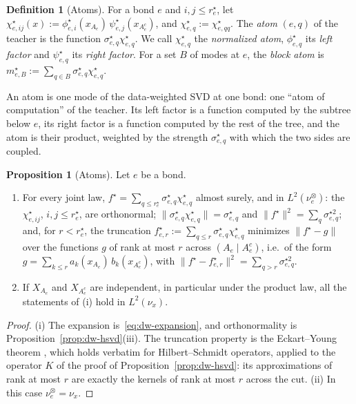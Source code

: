 \documentclass[11pt]{article}
\newcommand{\norm}[1]{\lVert #1\rVert}
\theoremstyle{definition}
\newtheorem{proposition}[theorem]{Proposition}
\newtheorem{definition}[theorem]{Definition}
\numberwithin{equation}{section}
\begin{document}
\begin{definition}[Atoms]\label{def:atom}
For a bond $e$ and $i,j\le r^\star_e$, let $\chi^\star_{e,ij}(x):=\phi^\star_{e,i}(x_{A_e})\,\psi^\star_{e,j}(x_{A_e^c})$, and $\chi^\star_{e,q}:=\chi^\star_{e,qq}$. The \emph{atom} $(e,q)$ of the teacher is the function $\sigma^\star_{e,q}\chi^\star_{e,q}$. We call $\chi^\star_{e,q}$ the \emph{normalized atom}, $\phi^\star_{e,q}$ its \emph{left factor} and $\psi^\star_{e,q}$ its \emph{right factor}. For a set $B$ of modes at $e$, the \emph{block atom} is $m^\star_{e,B}:=\sum_{q\in B}\sigma^\star_{e,q}\chi^\star_{e,q}$.
\end{definition}

An atom is one mode of the data-weighted SVD at one bond: one ``atom of computation'' of the teacher. Its left factor is a function computed by the subtree below $e$, its right factor is a function computed by the rest of the tree, and the atom is their product, weighted by the strength $\sigma^\star_{e,q}$ with which the two sides are coupled.

\begin{proposition}[Atoms]\label{prop:atoms}
Let $e$ be a bond.
\begin{enumerate}[label=(\roman*),nosep]
\item For every joint law, $f^\star=\sum_{q\le r^\star_e}\sigma^\star_{e,q}\chi^\star_{e,q}$ almost surely, and in $L^2(\nu^\otimes_e)$: the $\chi^\star_{e,ij}$, $i,j\le r^\star_e$, are orthonormal; $\norm{\sigma^\star_{e,q}\chi^\star_{e,q}}=\sigma^\star_{e,q}$ and $\norm{f^\star}^2=\sum_q\sigma^{\star2}_{e,q}$; and, for $r<r^\star_e$, the truncation $f^\star_{e,r}:=\sum_{q\le r}\sigma^\star_{e,q}\chi^\star_{e,q}$ minimizes $\norm{f^\star-g}$ over the functions $g$ of rank at most $r$ across $(A_e\mid A_e^c)$, i.e.\ of the form $g=\sum_{k\le r}a_k(x_{A_e})\,b_k(x_{A_e^c})$, with $\norm{f^\star-f^\star_{e,r}}^2=\sum_{q>r}\sigma^{\star2}_{e,q}$.
\item If $X_{A_e}$ and $X_{A_e^c}$ are independent, in particular under the product law, all the statements of (i) hold in $L^2(\nu_x)$.
\end{enumerate}
\end{proposition}

\begin{proof}
(i) The expansion is~\eqref{eq:dw-expansion}, and orthonormality is Proposition~\ref{prop:dw-hsvd}(iii). The truncation property is the Eckart--Young theorem \citep{eckart1936approximation}, which holds verbatim for Hilbert--Schmidt operators, applied to the operator $K$ of the proof of Proposition~\ref{prop:dw-hsvd}: its approximations of rank at most $r$ are exactly the kernels of rank at most $r$ across the cut. (ii) In this case $\nu^\otimes_e=\nu_x$.
\end{proof}
\end{document}
